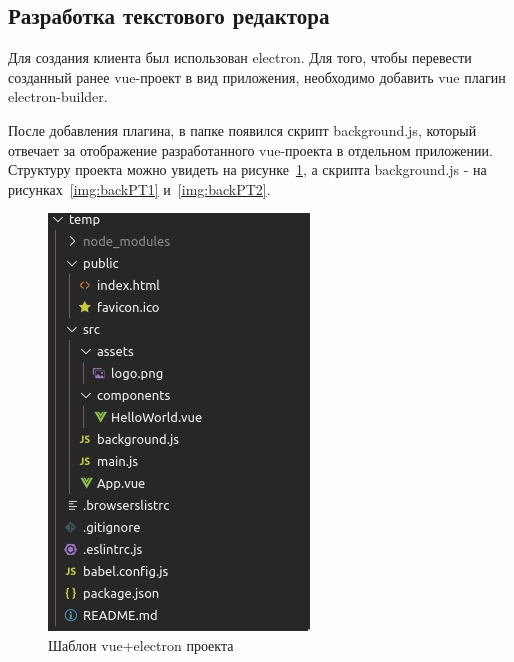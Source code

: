 \subsection{Разработка текстового редактора}

Для создания клиента был использован electron. Для того, чтобы перевести созданный ранее vue-проект в вид приложения, необходимо добавить vue плагин electron-builder.

После добавления плагина, в папке появился скрипт background.js, который отвечает за отображение разработанного vue-проекта в отдельном приложении. Структуру проекта можно увидеть на рисунке~\ref{img:vueElectronTemp}, а скрипта background.js - на рисунках~\ref{img:backPT1} и~\ref{img:backPT2}.

\begin{figure}[H]
  \centering
  \includegraphics[height=0.4\textheight]{TexModules/pics/vueElectronTemp.jpg}
  \caption{Шаблон vue+electron проекта}
  \label{img:vueElectronTemp}
\end{figure}

